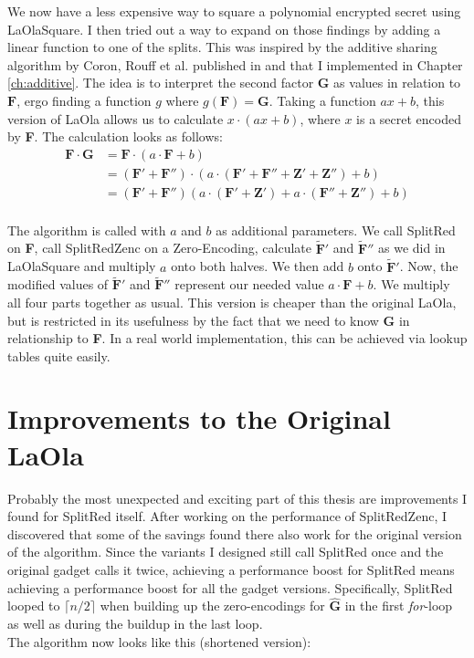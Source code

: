 \documentclass[english, version-2020-11]{uzl-thesis}
\begin{document}
  We now have a less expensive way to square a polynomial encrypted secret using LaOlaSquare. I then tried out a way to expand on those findings by adding a linear function to one of the splits. This was inspired by the additive sharing algorithm by Coron, Rouff et al. published in \cite{Coron2015} and that I implemented in Chapter \ref{ch:additive}. The idea is to interpret the second factor $\mathbf{G}$ as values in relation to $\mathbf{F}$, ergo finding a function $g$ where $g(\mathbf{F})=\mathbf{G}$.
  Taking a function $ax +b$, this version of LaOla allows us to calculate $x \cdot (ax+b)$, where $x$ is a secret encoded by \textbf{F}. The calculation looks as follows:
  \begin{equation*}
    \begin{split}
    \mathbf{F}\cdot \mathbf{G}& =\mathbf{F}\cdot (a\cdot \mathbf{F}+b)\\
    & =(\mathbf{F'}+\mathbf{F''})\cdot (a\cdot(\mathbf{F'}+\mathbf{F''}+\mathbf{Z'}+\mathbf{Z''})+b) \\
    & = (\mathbf{F'}+\mathbf{F''})(a\cdot(\mathbf{F'}+\mathbf{Z'})+a\cdot(\mathbf{F''}+\mathbf{Z''})+b)\\
    \end{split}
  \end{equation*}

  The algorithm is called with $a$ and $b$ as additional parameters. We call SplitRed on \textbf{F}, call SplitRedZenc on a Zero-Encoding, calculate $\tilde{\mathbf{F}}'$ and $\tilde{\mathbf{F}}''$ as we did in LaOlaSquare and multiply $a$ onto both halves. We then add $b$ onto $\tilde{\mathbf{F}}'$. Now, the modified values of $\tilde{\mathbf{F}}'$ and $\tilde{\mathbf{F}}''$ represent our needed value $a \cdot \mathbf{F} + b$. We multiply all four parts together as usual.
  This version is cheaper than the original LaOla, but is restricted in its usefulness by the fact that we need to know \textbf{G} in relationship to \textbf{F}. In a real world implementation, this can be achieved via lookup tables quite easily.


    \section{Improvements to the Original LaOla}
Probably the most unexpected and exciting part of this thesis are improvements I found for SplitRed itself. After working on the performance of SplitRedZenc, I discovered that some of the savings found there also work for the original version of the algorithm. Since the variants I designed still call SplitRed once and the original gadget calls it twice, achieving a performance boost for SplitRed means achieving a performance boost for all the gadget versions.
Specifically, SplitRed looped to $\lceil n/2 \rceil$ when building up the zero-encodings for $\hat{\mathbf{G}}$ in the first \textit{for}-loop as well as during the buildup in the last loop. \\
The algorithm now looks like this (shortened version):
\end{document}
